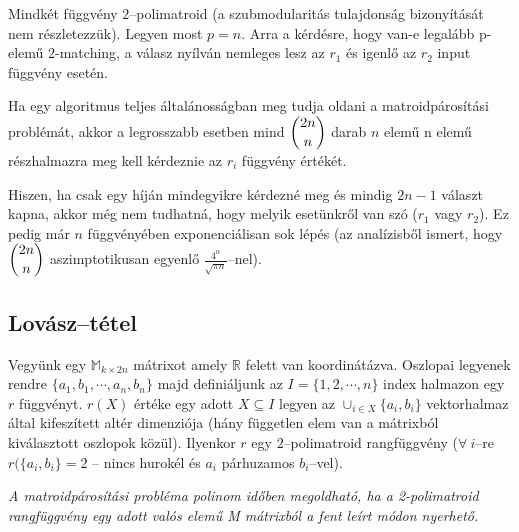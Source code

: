 Mindkét függvény $2$--polimatroid (a szubmodularitás tulajdonság bizonyítását
nem részletezzük). Legyen most $p=n$. Arra a kérdésre, hogy van-e legalább
p-elemű $2$-matching, a válasz nyílván nemleges lesz az $r_1$ és igenlő az $r_2$
input függvény esetén.

Ha egy algoritmus teljes általánosságban meg tudja oldani a matroidpárosítási
problémát, akkor a legrosszabb esetben mind $\dbinom{2n}{n}$ darab $n$ elemű n
elemű részhalmazra meg kell kérdeznie az $r_i$ függvény értékét.

Hiszen, ha csak egy híján mindegyikre kérdezné meg és mindig $2n-1$ választ
kapna, akkor még nem tudhatná, hogy melyik esetünkről van szó ($r_1$ vagy
$r_2$). Ez pedig már $n$ függvényében exponenciálisan sok lépés (az analízisből
ismert, hogy $\dbinom{2n}{n}$ aszimptotikusan egyenlő $\frac{4^n}{\sqrt{\pi
			n}}$--nel).

\subsection{Lovász--tétel}

Vegyünk egy $\mathbb{M}_{k \times 2n}$ mátrixot amely $\mathbb{R}$ felett van
koordinátázva. Oszlopai legyenek rendre $\{a_1, b_1, \cdots, a_n, b_n \}$ majd
definiáljunk az $I=\{1,2,\cdots,n\}$ index halmazon egy $r$ függvényt. $r(X)$
értéke egy adott $X\subseteq I$ legyen az $\cup_{i \in X}\{a_i, b_i\}$
vektorhalmaz által kifeszített altér dimenziója (hány független elem van a
mátrixból kiválasztott oszlopok közül). Ilyenkor $r$ egy $2$--polimatroid
rangfüggvény ($\forall~i$--re $r(\{a_i, b_i\}=2$ -- nincs hurokél és $a_i$
párhuzamos $b_i$--vel).

\vspace{0.4cm}
\emph{
	A matroidpárosítási probléma polinom időben megoldható, ha a 2-polimatroid
	rangfüggvény egy adott valós elemű M mátrixból a fent leírt módon nyerhető.}
